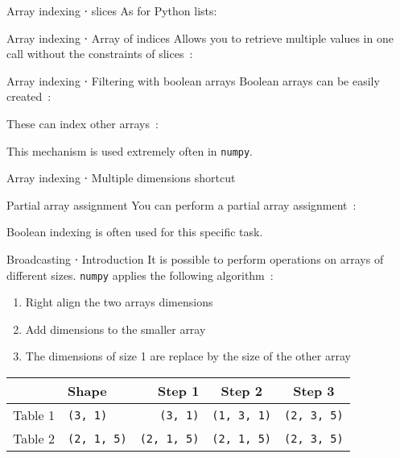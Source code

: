 \begin{frame}{Array indexing ⋅ slices}
  As for Python lists:
\end{frame}

\begin{frame}{Array indexing ⋅ Array of indices}
  Allows you to retrieve multiple values in one call without the constraints of slices~:
\end{frame}

\begin{frame}{Array indexing ⋅ Filtering with boolean arrays}
  Boolean arrays can be easily created~:

  These can index other arrays~:

  This mechanism is used extremely often in \texttt{numpy}.
\end{frame}

\begin{frame}{Array indexing ⋅ Multiple dimensions shortcut}
\end{frame}

\begin{frame}{Partial array assignment}
  You can perform a partial array assignment~:

  Boolean indexing is often used for this specific task.
\end{frame}

\begin{frame}{Broadcasting ⋅ Introduction}
  It is possible to perform operations on arrays of different sizes.
  \texttt{numpy} applies the following algorithm~:
  \begin{enumerate}
    \item Right align the two arrays dimensions
    \item Add dimensions to the smaller array
    \item The dimensions of size 1 are replace by the size of the other array 
  \end{enumerate}
  \begin{tabular}{clrcc}
    \toprule
    & Shape & Step 1 & Step 2 & Step 3 \\
    \midrule
    Table 1 & \texttt{(3, 1)} & \texttt{(3, 1)} & \texttt{(1, 3, 1)} & \texttt{(2, 3, 5)} \\
    Table 2 & \texttt{(2, 1, 5)} & \texttt{(2, 1, 5)} & \texttt{(2, 1, 5)} & \texttt{(2, 3, 5)} \\
    \bottomrule
  \end{tabular}
\end{frame}

